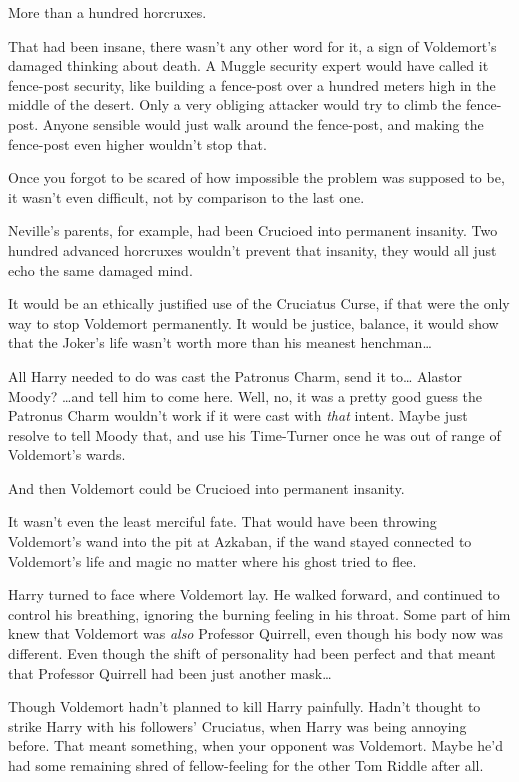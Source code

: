 More than a hundred horcruxes.

That had been insane, there wasn't any other word for it, a sign of Voldemort's damaged thinking about death. A Muggle security expert would have called it fence-post security, like building a fence-post over a hundred meters high in the middle of the desert. Only a very obliging attacker would try to climb the fence-post. Anyone sensible would just walk around the fence-post, and making the fence-post even higher wouldn't stop that.

Once you forgot to be scared of how impossible the problem was supposed to be, it wasn't even difficult, not by comparison to the last one.

Neville's parents, for example, had been Crucioed into permanent insanity. Two hundred advanced horcruxes wouldn't prevent that insanity, they would all just echo the same damaged mind.

It would be an ethically justified use of the Cruciatus Curse, if that were the only way to stop Voldemort permanently. It would be justice, balance, it would show that the Joker's life wasn't worth more than his meanest henchman{\ldots}

All Harry needed to do was cast the Patronus Charm, send it to{\ldots} Alastor Moody? {\ldots}and tell him to come here. Well, no, it was a pretty good guess the Patronus Charm wouldn't work if it were cast with \emph{that} intent. Maybe just resolve to tell Moody that, and use his Time-Turner once he was out of range of Voldemort's wards.

And then Voldemort could be Crucioed into permanent insanity.

It wasn't even the least merciful fate. That would have been throwing Voldemort's wand into the pit at Azkaban, if the wand stayed connected to Voldemort's life and magic no matter where his ghost tried to flee.

Harry turned to face where Voldemort lay. He walked forward, and continued to control his breathing, ignoring the burning feeling in his throat. Some part of him knew that Voldemort was \emph{also} Professor Quirrell, even though his body now was different. Even though the shift of personality had been perfect and that meant that Professor Quirrell had been just another mask{\ldots}

Though Voldemort hadn't planned to kill Harry painfully. Hadn't thought to strike Harry with his followers' Cruciatus, when Harry was being annoying before. That meant something, when your opponent was Voldemort. Maybe he'd had some remaining shred of fellow-feeling for the other Tom Riddle after all.

